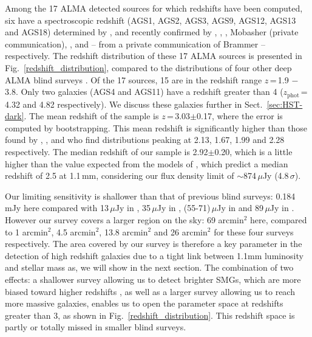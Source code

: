 \documentclass[longauth]{aa}
\begin{document}
Among the 17 ALMA detected sources for which redshifts have been computed, six have a spectroscopic redshift (AGS1, AGS2, AGS3, AGS9, AGS12, AGS13 and AGS18) determined by \mbox{\cite{Kurk2013}}, and recently confirmed by \cite{Barro2017}, \cite{Momcheva2016}, \cite{Vanzella2008}, Mobasher (private communication), \cite{Inami2017}, \cite{Kriek2008} and \citealt{Dunlop2017} -- from a private communication of Brammer -- respectively. The redshift distribution of these 17 ALMA sources is presented in Fig.~\ref{redshift_distribution}, compared to the distributions of four other deep ALMA blind surveys \citep{Dunlop2017,Aravena2016,Gonzalez-Lopez2017, Ueda2018}.
Of the 17 sources, 15 are in the redshift range $z$\,=\,1.9 $-$ 3.8. Only two galaxies (AGS4 and AGS11) have a redshift greater than 4 ($z_{\text{phot}}$\,=\,4.32 and 4.82 respectively). We discuss these galaxies further in Sect.~\ref{sec:HST-dark}. The mean redshift of the sample is $z$\,=\,3.03$\pm$0.17, where the error is computed by bootstrapping. This mean redshift is significantly higher than those found by \cite{Dunlop2017}, \cite{Aravena2016}, \cite{Gonzalez-Lopez2017} and \cite{Ueda2018} who find distributions peaking at 2.13, 1.67, 1.99 and 2.28 respectively. The median redshift of our sample is 2.92$\pm$0.20, which is a little higher than the value expected from the models of \cite{Bethermin2015}, which predict a median redshift of 2.5 at 1.1\,mm, considering our flux density limit of $\sim$874\,$\mu$Jy (4.8\,$\sigma$).

Our limiting sensitivity is shallower than that of previous blind surveys: 0.184\,mJy here compared with 13\,$\mu$Jy in \cite{Aravena2016}, 35\,$\mu$Jy in \cite{Dunlop2017}, (55-71)\,$\mu$Jy in \cite{Gonzalez-Lopez2017} and 89\,$\mu$Jy in \cite{Ueda2018}. However our survey covers a larger region on the sky: 69 arcmin$^2$ here, compared to 1 arcmin$^2$, 4.5 arcmin$^2$, 13.8 arcmin$^2$ and 26 arcmin$^2$ for these four surveys respectively. The area covered by our survey is therefore a key parameter in the detection of high redshift galaxies due to a tight link between 1.1mm luminosity and stellar mass as, we will show in the next section. The combination of two effects: a shallower survey allowing us to detect brighter SMGs, which are more biased toward higher redshifts \citep[e.g.][]{Pope2005}, as well as a larger survey allowing us to reach more massive galaxies, enables us to open the parameter space at redshifts greater than 3, as shown in Fig.~\ref{redshift_distribution}. This redshift space is partly or totally missed in smaller blind surveys.
\end{document}
